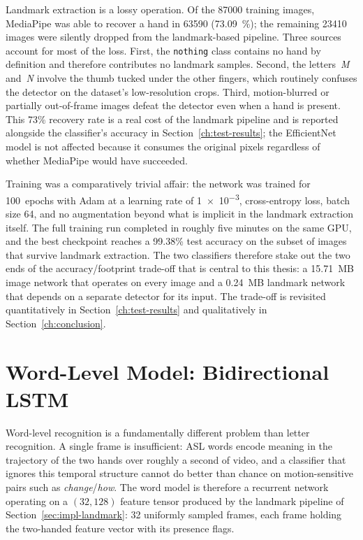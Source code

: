 Landmark extraction is a lossy operation. Of the \num{87000} training
images, MediaPipe was able to recover a hand in \num{63590}
(\SI{73.09}{\percent}); the remaining \num{23410} images were
silently dropped from the landmark-based pipeline. Three sources
account for most of the loss. First, the \texttt{nothing} class
contains no hand by definition and therefore contributes no landmark
samples. Second, the letters~\textit{M} and~\textit{N} involve the
thumb tucked under the other fingers, which routinely confuses the
detector on the dataset's low-resolution crops. Third, motion-blurred
or partially out-of-frame images defeat the detector even when a
hand is present. This 73\% recovery rate is a real cost of the
landmark pipeline and is reported alongside the classifier's
accuracy in Section~\ref{ch:test-results}; the EfficientNet model is
not affected because it consumes the original pixels regardless of
whether MediaPipe would have succeeded.

Training was a comparatively trivial affair: the network was trained
for 100~epochs with Adam at a learning rate of \num{1e-3},
cross-entropy loss, batch size 64, and no augmentation beyond what
is implicit in the landmark extraction itself. The full training run
completed in roughly five minutes on the same GPU, and the best
checkpoint reaches a 99.38\% test accuracy on the subset of images
that survive landmark extraction. The two classifiers therefore
stake out the two ends of the accuracy/footprint trade-off that is
central to this thesis: a 15.71~MB image network that operates on
every image and a 0.24~MB landmark network that depends on a
separate detector for its input. The trade-off is revisited
quantitatively in Section~\ref{ch:test-results} and qualitatively in
Section~\ref{ch:conclusion}.

\section{Word-Level Model: Bidirectional LSTM}
\label{sec:impl-lstm}

Word-level recognition is a fundamentally different problem than
letter recognition. A single frame is insufficient: ASL words encode
meaning in the trajectory of the two hands over roughly a second of
video, and a classifier that ignores this temporal structure cannot
do better than chance on motion-sensitive pairs such as
\textit{change}/\textit{how}. The word model is therefore a
recurrent network operating on a \((32, 128)\) feature tensor
produced by the landmark pipeline of
Section~\ref{sec:impl-landmark}: 32 uniformly sampled frames, each
frame holding the two-handed feature vector with its presence flags.

